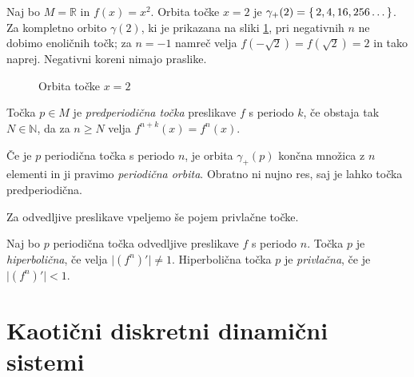\documentclass{isrmdelo}
\newcommand{\R}{\mathbb R}
\newcommand{\N}{\mathbb N}
\begin{document}
\begin{zgled}
Naj bo $M = \R$ in $f(x) = x^2$. Orbita točke $x = 2$ je $\gamma_{+}(2) = \set{2, 4, 16, 256 \dots} $. Za kompletno orbito $\gamma(2)$, ki je prikazana na sliki \ref{fig:orbita}, pri negativnih $n$ ne dobimo enoličnih točk; za $n = -1$ namreč velja $f(-\sqrt{2}) = f(\sqrt{2}) = 2$ in tako naprej. Negativni koreni nimajo praslike.

\begin{figure}[h!]  
\centering 
{}
\bigskip
\caption{Orbita točke $x=2$}\label{fig:orbita}  
\end{figure} 
\end{zgled}

\bigskip

\begin{definicija}
Točka $p \in M$ je \emph{predperiodična točka} preslikave $f$ s periodo $k$, če obstaja tak $N \in \N$, da za $n \geq N$ velja $f^{n+k}(x) = f^{n}(x)$.
\end{definicija}

Če je $p$ periodična točka s periodo $n$, je orbita $\gamma_{+}(p)$ končna množica z $n$ elementi in ji pravimo \emph{periodična orbita}. Obratno ni nujno res, saj je lahko točka predperiodična.

\bigskip

Za odvedljive preslikave vpeljemo še pojem privlačne točke.

\begin{definicija}Naj bo $p$ periodična točka odvedljive preslikave $f$ s periodo $n$. Točka $p$ je \emph{hiperbolična}, če velja $\vert (f^n)' \vert \neq 1$. Hiperbolična točka $p$ je \emph{privlačna}, če je $\vert (f^n)' \vert < 1$.
\end{definicija}

\section{Kaotični diskretni dinamični sistemi}
\end{document}
